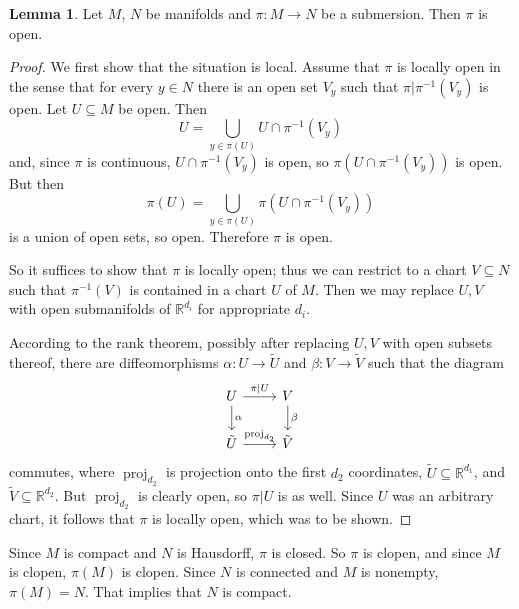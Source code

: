 \documentclass[10pt]{article}
\newcommand{\RR}{\mathbb{R}}
\DeclareMathOperator{\proj}{proj}
\theoremstyle{definition}
\newtheorem{lemma}{Lemma}[exer]
\begin{document}
\begin{lemma}
Let $M$, $N$ be manifolds and $\pi: M \to N$ be a submersion.
Then $\pi$ is open.
\end{lemma}
\begin{proof}
We first show that the situation is local.
Assume that $\pi$ is locally open in the sense that for every $y \in N$ there is an open set $V_y$ such that $\pi|\pi^{-1}(V_y)$ is open.
Let $U \subseteq M$ be open. Then
$$U = \bigcup_{y \in \pi(U)} U \cap \pi^{-1}(V_y)$$
and, since $\pi$ is continuous, $U \cap \pi^{-1}(V_y)$ is open, so $\pi(U \cap \pi^{-1}(V_y))$ is open.
But then
$$\pi(U) = \bigcup_{y \in \pi(U)} \pi(U \cap \pi^{-1}(V_y))$$
is a union of open sets, so open. Therefore $\pi$ is open.

So it suffices to show that $\pi$ is locally open; thus we can restrict to a chart $V \subseteq N$ such that $\pi^{-1}(V)$ is contained in a chart $U$ of $M$.
Then we may replace $U, V$ with open submanifolds of $\RR^{d_i}$ for appropriate $d_i$.

According to the rank theorem, possibly after replacing $U, V$ with open subsets thereof, there are diffeomorphisms $\alpha: U \to \tilde U$ and $\beta: V \to \tilde V$ such that the diagram
$$\begin{tikzcd}
U \arrow[r, "\pi|U"] \arrow[d,"\alpha"]& V \arrow[d,"\beta"]\\
\tilde U \arrow[r,"\proj_{d_2}"] &\tilde V
\end{tikzcd}
$$
commutes, where $\proj_{d_2}$ is projection onto the first $d_2$ coordinates, $\tilde U \subseteq \RR^{d_1}$, and $\tilde V \subseteq \RR^{d_2}$.
But $\proj_{d_2}$ is clearly open, so $\pi|U$ is as well.
Since $U$ was an arbitrary chart, it follows that $\pi$ is locally open, which was to be shown.
\end{proof}

Since $M$ is compact and $N$ is Hausdorff, $\pi$ is closed.
So $\pi$ is clopen, and since $M$ is clopen, $\pi(M)$ is clopen.
Since $N$ is connected and $M$ is nonempty, $\pi(M) = N$.
That implies that $N$ is compact.
\end{document}
